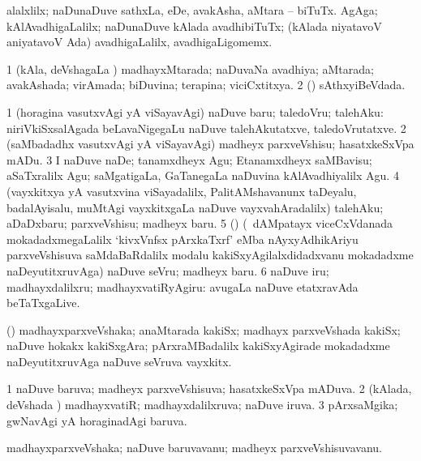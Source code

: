 \noindent 
\gl{\pagu}
\bmng
{} 
\banum
{} alalxlilx; naDunaDuve sathxLa, eDe, avakAsha, aMtara -- biTuTx. 
 AgAga; kAlAvadhigaLalilx; naDunaDuve kAlada avadhibiTuTx; (kAlada niyatavoV aniyatavoV Ada) avadhigaLalilx, avadhigaLigomemx. 
\eanum
\emng
\eentry

\bentry
{}
\gl{\gu}
\bmng
\bnum
\num{1} (kAla, deVshagaLa \vi) madhayxMtarada; naDuvaNa avadhiya; aMtarada; avakAshada; virAmada; biDuvina; terapina; viciCxtitxya. 
\num{2} (\saM) sAthxyiBeVdada. 
\enum
\emng
\eentry

\bentry
{}
\gl{\akirx}
\bmng
\bnum
\num{1} (horagina vasutxvAgi yA viSayavAgi) naDuve baru; taledoVru; talehAku:  niriVkiSxsalAgada beLavaNigegaLu naDuve talehAkutatxve, taledoVrutatxve. 
\num{2} (saMbadadhx vasutxvAgi yA viSayavAgi) madheyx parxveVshisu; hasatxkeSxVpa mADu. 
\num{3} I naDuve naDe; tanamxdheyx Agu; Etanamxdheyx saMBavisu; aSaTxralilx Agu; saMgatigaLa, GaTanegaLa naDuvina kAlAvadhiyalilx Agu. 
\num{4} (vayxkitxya yA vasutxvina viSayadalilx, PalitAMshavanunx taDeyalu, badalAyisalu, muMtAgi vayxkitxgaLa naDuve vayxvahAradalilx) talehAku; aDaDxbaru; parxveVshisu; madheyx baru. 
\num{5} (\nAyxshA) (\kanmu\ dAMpatayx viceCxVdanada mokadadxmegaLalilx `kivxVnfsx pArxkaTxrf' eMba nAyxyAdhikAriyu parxveVshisuva saMdaBaRdalilx modalu kakiSxyAgilalxdidadxvanu mokadadxme naDeyutitxruvAga) naDuve seVru; madheyx baru. 
\num{6} naDuve iru; madhayxdalilxru; madhayxvatiRyAgiru:  avugaLa naDuve etatxravAda beTaTxgaLive. 
\enum
\emng
\eentry

\bentry
{}
\gl{\nA}
\bmng
(\nAyxshA) madhayxparxveVshaka; anaMtarada kakiSx; madhayx parxveVshada kakiSx; naDuve hokakx kakiSxgAra; pArxraMBadalilx kakiSxyAgirade mokadadxme naDeyutitxruvAga naDuve seVruva vayxkitx. 
\emng
\eentry

\bentry
{}
\gl{\gu}
\bmng
\bnum
\num{1} naDuve baruva; madheyx parxveVshisuva; hasatxkeSxVpa mADuva. 
\num{2} (kAlada, deVshada \vi) madhayxvatiR; madhayxdalilxruva; naDuve iruva. 
\num{3} pArxsaMgika; gwNavAgi yA horaginadAgi baruva. 
\enum
\emng
\eentry

\bentry
{}
\gl{\nA}
\bmng
madhayxparxveVshaka; naDuve baruvavanu; madheyx parxveVshisuvavanu. 
\emng
\eentry

